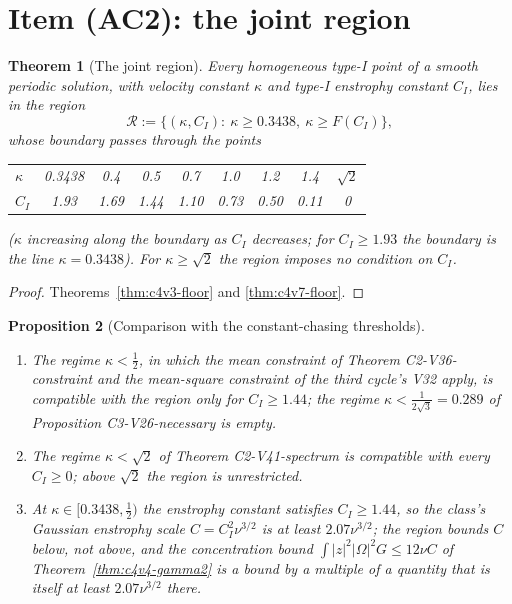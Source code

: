 \documentclass[11pt]{article}
\theoremstyle{plain}
\newtheorem{theorem}{Theorem}[section]
\newtheorem{proposition}[theorem]{Proposition}
\theoremstyle{definition}
\theoremstyle{remark}
\begin{document}
\section{Item (AC2): the joint region}
\label{sec:c4v8-region}

\begin{theorem}[The joint region]
\label{thm:c4v8-region}
Every homogeneous type-I point of a smooth periodic solution, with
velocity constant \(\kappa\) and type-I enstrophy constant \(C_I\), lies in the
region
\begin{equation}
 \mathcal R:=\bigl\{(\kappa,C_I):\ \kappa\ge0.3438,\ \kappa\ge F(C_I)\bigr\},
 \label{eq:c4v8-region}
\end{equation}
whose boundary passes through the points
\medskip
\begin{center}\small
\begin{tabular}{@{}lcccccccc@{}}
\toprule
\(\kappa\) & 0.3438 & 0.4 & 0.5 & 0.7 & 1.0 & 1.2 & 1.4 & \(\sqrt2\)\\
\(C_I\) & 1.93 & 1.69 & 1.44 & 1.10 & 0.73 & 0.50 & 0.11 & 0\\
\bottomrule
\end{tabular}
\end{center}
\medskip
(\(\kappa\) increasing along the boundary as \(C_I\) decreases; for \(C_I\ge1.93\) the
boundary is the line \(\kappa=0.3438\)).  For \(\kappa\ge\sqrt2\) the region imposes no
condition on \(C_I\).
\end{theorem}

\begin{proof}
Theorems~\ref{thm:c4v3-floor} and \ref{thm:c4v7-floor}.
\end{proof}

\begin{proposition}[Comparison with the constant-chasing thresholds]
\label{prop:c4v8-comparison}
\begin{enumerate}[label=\textup{(\arabic*)},leftmargin=3.2em]
\item The regime \(\kappa<\frac12\), in which the mean constraint of Theorem
      C2-V36-constraint and the mean-square constraint of the third
      cycle's V32 apply, is compatible with the region only for
      \(C_I\ge1.44\); the regime \(\kappa<\frac1{2\sqrt3}=0.289\) of Proposition
      C3-V26-necessary is empty.
\item The regime \(\kappa<\sqrt2\) of Theorem C2-V41-spectrum is compatible with
      every \(C_I\ge0\); above \(\sqrt2\) the region is unrestricted.
\item At \(\kappa\in[0.3438,\frac12)\) the enstrophy constant satisfies \(C_I\ge1.44\), so
      the class's Gaussian enstrophy scale \(C=C_I^2\nu^{3/2}\) is at least
      \(2.07\nu^{3/2}\); the region bounds \(C\) below, not above, and the
      concentration bound \(\int|z|^2|\Omega|^2G\le12\nu C\) of Theorem~\ref{thm:c4v4-gamma2}
      is a bound by a multiple of a quantity that is itself at least
      \(2.07\nu^{3/2}\) there.
\end{enumerate}
\end{proposition}
\end{document}

